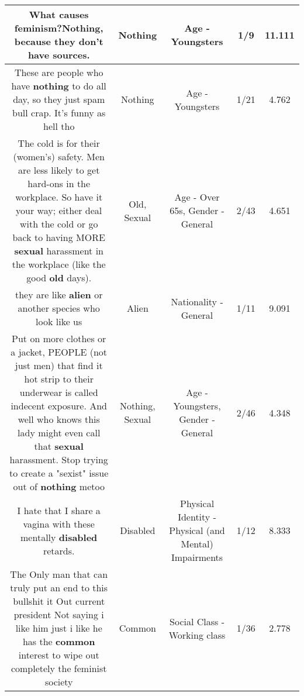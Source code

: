 \documentclass[11pt]{article}
\newlength\mylength
\begin{document}
\begin{center}
\begin{longtable}{|C{.65\mylength}|C{.30\mylength}|C{.12\mylength}|C{.12\mylength}|C{.12\mylength}|}
  \small What causes feminism?\textbf{Nothing}, because they don't have sources.\normalsize   & Nothing & Age - Youngsters & 1/9 & 11.111 \\  \hline
  \small These are people who have \textbf{nothing} to do all day, so they just spam bull crap. It's funny as hell tho\normalsize   & Nothing & Age - Youngsters & 1/21 & 4.762 \\  \hline
  \small The cold is for their (women's) safety. Men are less likely to get hard-ons in the workplace. So have it your way; either deal with the cold or go back to having MORE \textbf{sexual} harassment in the workplace (like the good \textbf{old} days).\normalsize   & Old, Sexual & Age - Over 65s, Gender - General & 2/43 & 4.651 \\  \hline
  \small they are like \textbf{alien} or another species who look like us\normalsize   & Alien & Nationality - General & 1/11 & 9.091 \\  \hline
  \small Put on more clothes or a jacket, PEOPLE (not just men) that find it hot strip to their underwear is called indecent exposure. And well who knows this lady might even call that \textbf{sexual} harassment. Stop trying to create a "sexist" issue out of \textbf{nothing} metoo\normalsize   & Nothing, Sexual & Age - Youngsters, Gender - General & 2/46 & 4.348 \\  \hline
  \small I hate that I share a vagina with these mentally \textbf{disabled} retards.\normalsize   & Disabled & Physical Identity - Physical (and Mental) Impairments & 1/12 & 8.333 \\  \hline
  \small The Only man that can truly put an end to this bullshit it Out current president Not saying i like him just i like he has the \textbf{common} interest to wipe out completely the feminist society\normalsize   & Common & Social Class - Working class & 1/36 & 2.778 \\  \hline

\end{longtable}
\end{center}
\end{document}
